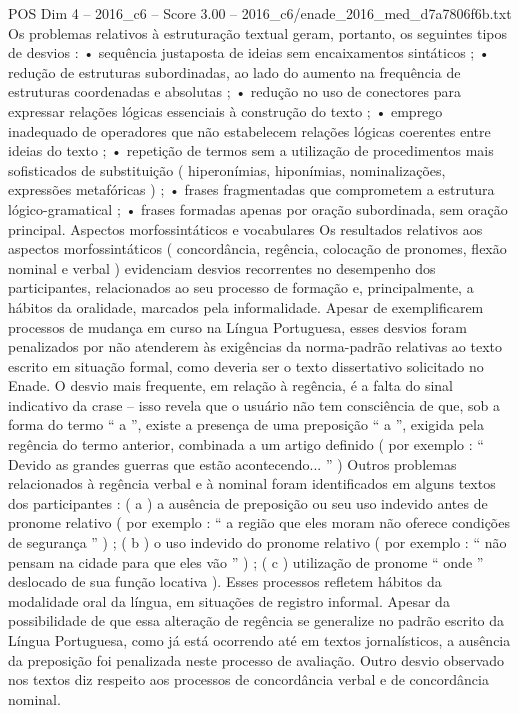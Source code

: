 \begin{textsample}{POS Dim 4 – 2016\_c6 – Score 3.00 – 2016\_c6/enade\_2016\_med\_d7a7806f6b.txt}
Os problemas relativos à estruturação textual geram, portanto, os seguintes tipos de desvios : • sequência justaposta de ideias sem encaixamentos sintáticos ; • redução de estruturas subordinadas, ao lado do aumento na frequência de estruturas coordenadas e absolutas ; • redução no uso de conectores para expressar relações lógicas essenciais à construção do texto ; • emprego inadequado de operadores que não estabelecem relações lógicas coerentes entre ideias do texto ; • repetição de termos sem a utilização de procedimentos mais sofisticados de substituição ( hiperonímias, hiponímias, nominalizações, expressões metafóricas ) ; • frases fragmentadas que comprometem a estrutura lógico-gramatical ; • frases formadas apenas por oração subordinada, sem oração principal.
Aspectos morfossintáticos e vocabulares Os resultados relativos aos aspectos morfossintáticos ( concordância, regência, colocação de pronomes, flexão nominal e verbal ) evidenciam desvios recorrentes no desempenho dos participantes, relacionados ao seu processo de formação e, principalmente, a hábitos da oralidade, marcados pela informalidade.
Apesar de exemplificarem processos de mudança em curso na Língua Portuguesa, esses desvios foram penalizados por não atenderem às exigências da norma-padrão relativas ao texto escrito em situação formal, como deveria ser o texto dissertativo solicitado no Enade.
O desvio mais frequente, em relação à regência, é a falta do sinal indicativo da crase – isso revela que o usuário não tem consciência de que, sob a forma do termo “ a ”, existe a presença de uma preposição “ a ”, exigida pela regência do termo anterior, combinada a um artigo definido ( por exemplo : “ Devido as grandes guerras que estão acontecendo... ” ) Outros problemas relacionados à regência verbal e à nominal foram identificados em alguns textos dos participantes : ( a ) a ausência de preposição ou seu uso indevido antes de pronome relativo ( por exemplo : “ a região que eles moram não oferece condições de segurança ” ) ; ( b ) o uso indevido do pronome relativo ( por exemplo : “ não pensam na cidade para que eles vão ” ) ; ( c ) utilização de pronome “ onde ” deslocado de sua função locativa ).
Esses processos refletem hábitos da modalidade oral da língua, em situações de registro informal.
Apesar da possibilidade de que essa alteração de regência se generalize no padrão escrito da Língua Portuguesa, como já está ocorrendo até em textos jornalísticos, a ausência da preposição foi penalizada neste processo de avaliação.
Outro desvio observado nos textos diz respeito aos processos de concordância verbal e de concordância nominal.

\end{textsample}
